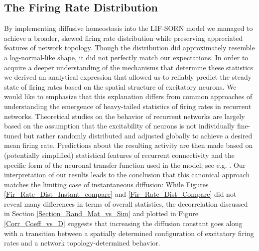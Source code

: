 \documentclass[10pt,a4paper]{article}
\begin{document}
\subsection{The Firing Rate Distribution} \label{Fir_Rate_Dist_Discussion_Section}
By implementing diffusive homeostasis into the LIF-SORN model we managed to achieve a broader, skewed firing rate distribution while preserving appreciated features of network topology. Though the distribution did approximately resemble a log-normal-like shape, it did not perfectly match our expectations. In order to acquire a deeper understanding of the mechanisms that determine these statistics we derived an analytical expression that allowed us to reliably predict the steady state of firing rates based on the spatial structure of excitatory neurons. We would like to emphasize that this explanation differs from common approaches of understanding the emergence of heavy-tailed statistics of firing rates in recurrent networks. Theoretical studies on the behavior of recurrent networks are largely based on the assumption that the excitability of neurons is not individually fine-tuned but rather randomly distributed and adjusted globally to achieve a desired mean firing rate. Predictions about the resulting activity are then made based on (potentially simplified) statistical features of recurrent connectivity and the specific form of the neuronal transfer function used in the model, see e.g. \cite{Roxin_Firing_Rate_Distribution,Vreeswijk1998,Koulakov_2009}. Our interpretation of our results leads to the conclusion that this canonical approach matches the limiting case of instantaneous diffusion: While Figures \ref{Fir_Rate_Dist_Instant_compare} and \ref{Fir_Rate_Dist_Compare} did not reveal many differences in terms of overall statistics, the decorrelation discussed in Section \ref{Section_Rand_Mat_vs_Sim} and plotted in Figure \ref{Corr_Coeff_vs_D} suggests that increasing the diffusion constant goes along with a transition between a spatially determined configuration of excitatory firing rates and a network topology-determined behavior.
\end{document}
